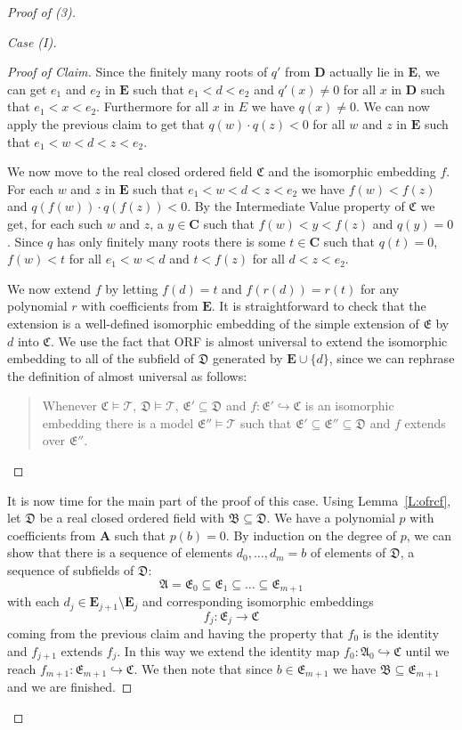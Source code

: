 \documentclass[titlepage, oneside]{amsbook}
\theoremstyle{plain}
\theoremstyle{definition}
\theoremstyle{remark}
\newcommand{\tee}{\ensuremath{\mathcal{T}}}
\newcommand{\seq}{\ensuremath{\subseteq}}
\newcommand{\ma}{\ensuremath{\mathfrak{A}}}
\newcommand{\mb}{\ensuremath{\mathfrak{B}}}
\newcommand{\mc}{\ensuremath{\mathfrak{C}}}
\newcommand{\md}{\ensuremath{\mathfrak{D}}}
\newcommand{\me}{\ensuremath{\mathfrak{E}}}
\newcommand{\ba}{\ensuremath{\mathbf{A}}}
\newcommand{\bc}{\ensuremath{\mathbf{C}}}
\newcommand{\bd}{\ensuremath{\mathbf{D}}}
\newcommand{\be}{\ensuremath{\mathbf{E}}}
\newcommand{\dnot}[2][0]{\ensuremath{ d_{#1} , \dots , d_{#2}}}
\begin{document}
\begin{proof}[Proof of (3)]
\begin{proof}[Case (I)]
\begin{proof}[Proof of Claim]  Since the finitely many roots of $q'$
from $\bd$ actually lie in $\be$, we can get $e_1$ and $e_2$ in $\be$
such that $e_1 < d < e_2$ and $q'(x) \neq 0$ for all $x$ in $\bd$
such that $e_1 < x < e_2$.  Furthermore for all $x$ in $E$ we have
$q(x) \neq 0$.  We can now apply the previous claim to get that
$q(w) \cdot q(z) < 0$ for all $w$ and $z$ in $\be$ such that $e_1 <
w < d < z < e_2$.

We now move to the real closed ordered field $\mc$ and the
isomorphic embedding $f$.  For each $w$ and $z$ in $\be$ such that
$e_1 < w < d < z < e_2$ we have $f(w) < f(z)$ and $q(f(w)) \cdot
q(f(z)) < 0$.  By the Intermediate Value property of $\mc$ we get, for
each such $w$ and $z$,  a
$y \in \bc$ such that $f(w) < y < f(z)$ and $q(y) =0$.  Since $q$
has only finitely many roots there is some $t \in \bc$ such that $q
(t) = 0$, $f(w) < t$ for all $e_1 < w < d$ and $t < f(z)$ for all $d
< z < e_2$.

We now extend $f$ by letting $f(d) = t$ and $f(r(d)) =r(t)$ for any
polynomial $r$ with coefficients from $\be$.  It is straightforward
to check that the extension is a well-defined isomorphic embedding
of the simple extension of $\me$ by $d$ into $\mc$.  We use the fact
that ORF is almost universal to extend the isomorphic embedding to
all of the subfield of $\md$ generated by $\be \cup \{ d \}$, since
%
we can rephrase the definition of almost universal as
follows: \begin{quotation} Whenever $\mc \models \tee$, $\md \models
\tee$, $\me' \seq \md$  and
$f: \me' \hookrightarrow \mc$ is an isomorphic embedding there is
a model $\me'' \models \tee$ such that $\me' \seq \me'' \seq \md$ and
$f$ extends over
$\me''$.
\end{quotation}


\renewcommand{\qedsymbol}{}
\end{proof}


It is now time for the main part of the proof of this case. Using
Lemma~\ref{L:ofrcf},  let
$\md$ be a real closed ordered field with $\mb \seq \md$.
We have a polynomial $p$ with coefficients from $\ba$ such that
$p(b) =0$.   By induction on the degree of $p$, we can show
that there is a sequence of elements $\dnot m = b$ of elements of
$\md$, a sequence of subfields of $\md$: \[ \ma = \me_0 \seq \me_1
\seq \dots \seq \me_{m+1} \] with each $d_j \in \be_{j+1} \setminus
\be_j $ and corresponding isomorphic embeddings
 \[f_j : \me_j \to \mc\]
coming from the previous claim and having the property that $f_0$ is
the identity and $f_{j+1}$ extends $f_j$.  In this way we extend the
identity map $f_0 : \ma_0 \hookrightarrow \mc$ until we reach
$f_{m+1} : \me_{m+1} \hookrightarrow \mc$.  We then note that since
$b \in \me_{m+1} $ we have $\mb \seq \me_{m+1}$ and we are finished.


\end{proof}
\end{proof}
\end{document}
